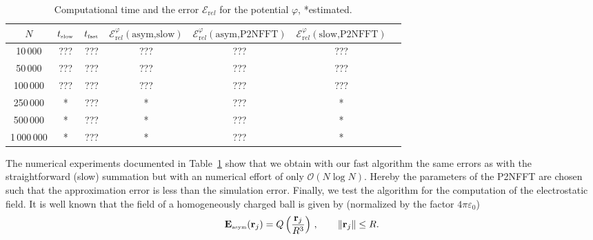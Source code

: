 \begin{table}[htb]
  \centering
  \begin{tabular}{|c||c|c|c|c|c|c|}
    \hline \rule{0mm}{5mm}
    $N$ & $t_{\mbox{\tiny slow}}$  &   $t_{\mbox{\tiny fast}}$
    &$\mathcal{E}_{\mathrm rel}^{\varphi}(\mbox{asym,slow})$
    &$\mathcal{E}_{\mathrm rel}^{\varphi}(\mbox{asym,P2NFFT})$
    &$\mathcal{E}_{\mathrm rel}^{\varphi}(\mbox{slow,P2NFFT})$  \\ \hline
    10\,000     & ??? & ??? & ??? & ??? &  ??? \\ \hline
    50\,000     & ??? & ??? & ??? & ??? &  ??? \\ \hline
    100\,000    & ??? & ??? & ??? & ??? &  ??? \\ \hline
    250\,000    & *   & ??? & *   & ??? &  *   \\ \hline
    500\,000    & *   & ??? & *   & ??? &  *   \\ \hline
    1\,000\,000 & *   & ??? & *   & ??? &  *   \\ \hline
  \end{tabular}
  \caption{Computational time and the error $\mathcal{E}_{\mathrm rel}$ for the potential $\varphi$, *estimated.\label{e2_potential}}
\end{table}
%
The numerical experiments documented in Table~\ref{e2_potential} show
that we obtain with our fast algorithm the same errors as with the
straightforward (slow) summation but with an numerical effort of only
$\mathcal{O}(N\log N)$. Hereby the parameters of the P2NFFT are chosen
such that the approximation error is less than the simulation error.
Finally, we test the algorithm for the computation of the
electrostatic field.  It is well known that the field of a
homogeneously charged ball is given by (normalized by the factor
$4\pi\varepsilon_0$)
\[
  \mathbf E_{\mbox {\tiny asym}}(\mathbf r_j)
  = Q \left( \frac{\mathbf r_j}{R^3}\right)\,,\qquad \|\mathbf r_j\|\leq R.
\]



